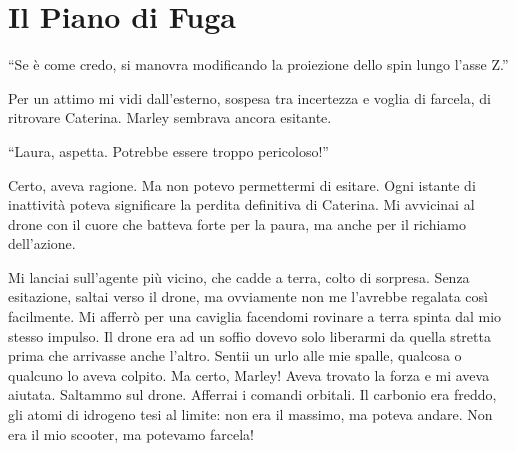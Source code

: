 \section{Il Piano di Fuga}

\begin{dialogue}
 \enquote{Se è come credo,  si manovra modificando la proiezione dello spin lungo l’asse Z.}
\end{dialogue}

Per un attimo mi vidi dall'esterno, sospesa tra incertezza e voglia di farcela, di ritrovare Caterina. Marley sembrava ancora esitante.

\begin{dialogue}
 \enquote{Laura, aspetta. Potrebbe essere troppo pericoloso!}
\end{dialogue}

Certo, aveva ragione. Ma non potevo permettermi di esitare. Ogni istante di inattività poteva significare la perdita definitiva di Caterina. Mi avvicinai al drone con il cuore che batteva forte per la paura, ma anche per il richiamo dell'azione.

Mi lanciai sull'agente più vicino, che cadde a terra, colto di sorpresa. Senza esitazione, saltai verso il drone, ma ovviamente non me l'avrebbe regalata così facilmente. Mi afferrò per una caviglia facendomi rovinare a terra spinta dal mio stesso impulso. Il drone era ad un soffio dovevo solo liberarmi da quella stretta prima che arrivasse anche l'altro. Sentii un urlo alle mie spalle, qualcosa o qualcuno lo aveva colpito. Ma certo, Marley! Aveva trovato la forza e mi aveva aiutata. Saltammo  sul drone.  Afferrai i comandi orbitali. Il carbonio era freddo, gli atomi di idrogeno tesi al limite: non era il massimo, ma poteva andare. Non era il mio scooter, ma potevamo farcela!




